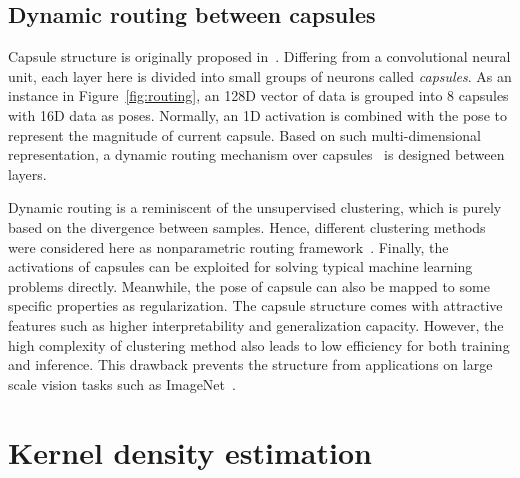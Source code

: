 \documentclass[runningheads]{llncs}
\begin{document}
\subsection{Dynamic routing between capsules}
Capsule structure is originally proposed in~\cite{hinton2011transforming}. Differing from a convolutional neural unit, each layer here is divided into small groups of neurons called \textit{capsules}. As an instance in Figure~\ref{fig:routing}, an 128D vector of data is grouped into 8 capsules with 16D data as poses. Normally, an 1D activation is combined with the pose to represent the magnitude of current capsule. Based on such multi-dimensional representation, a dynamic routing mechanism over capsules~\cite{sabour2017dynamic} is designed between layers. 

Dynamic routing is a reminiscent of the unsupervised clustering, which is purely based on the divergence between samples. Hence, different clustering methods were considered here as nonparametric routing framework~\cite{hinton2018emrouting}. Finally, the activations of capsules can be exploited for solving typical machine learning problems directly. Meanwhile, the pose of capsule can also be mapped to some specific properties as regularization. The capsule structure comes with attractive features such as higher interpretability and generalization capacity. However, the high complexity of clustering method also leads to low efficiency for both training and inference. This drawback prevents the structure from applications on large scale vision tasks such as ImageNet~\cite{ILSVRC15}. 

\section{Kernel density estimation}
\end{document}
